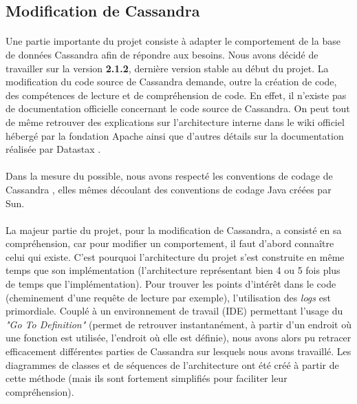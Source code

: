 \documentclass[12pt]{article}
\begin{document}
\subsection{Modification de Cassandra}

\paragraph{}Une partie importante du projet consiste à adapter le comportement de la base de données Cassandra afin de répondre aux besoins. Nous avons décidé de travailler sur la version \textbf{2.1.2}, dernière version stable au début du projet. La modification du code source de Cassandra demande, outre la création de code, des compétences de lecture et de compréhension de code. En effet, il n'existe pas de documentation officielle concernant le code source de Cassandra. On peut tout de même retrouver des explications sur l'architecture interne dans le wiki officiel hébergé par la fondation Apache \cite{CassArchi13} ainsi que d'autres détails sur la documentation réalisée par Datastax \cite{DatastaxDoc15}.

\paragraph{}Dans la mesure du possible, nous avons respecté les conventions de codage de Cassandra \cite{CassCodeStyle14}, elles mêmes découlant des conventions de codage Java créées par Sun.

\paragraph{}La majeur partie du projet, pour la modification de Cassandra, a consisté en sa compréhension, car pour modifier un comportement, il faut d'abord connaître celui qui existe. C'est pourquoi l'architecture du projet s'est construite en même temps que son implémentation (l'architecture représentant bien 4 ou 5 fois plus de temps que l'implémentation). Pour trouver les points d'intérêt dans le code (cheminement d'une requête de lecture par exemple), l'utilisation des \textit{logs} est primordiale. Couplé à un environnement de travail (IDE) permettant l'usage du \textit{"Go To Definition"} (permet de retrouver instantanément, à partir d'un endroit où une fonction est utilisée, l'endroit où elle est définie), nous avons alors pu retracer efficacement différentes parties de Cassandra sur lesquels nous avons travaillé. Les diagrammes de classes et de séquences de l'architecture ont été créé à partir de cette méthode (mais ils sont fortement simplifiés pour faciliter leur compréhension).
\end{document}
